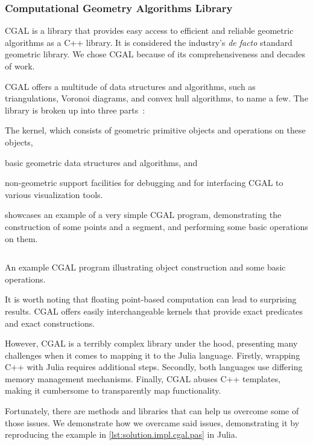 \subsubsection{Computational Geometry Algorithms Library}%
\label{sec:solution.impl.cgal}

\Ac{CGAL} is a library that provides easy access to efficient and reliable
geometric algorithms as a C++ library.  It is considered the industry's
\textit{de facto} standard geometric library.  We chose \ac{CGAL} because of its
comprehensiveness and decades of work.

\ac{CGAL} offers a multitude of data structures and algorithms, such as
triangulations, Voronoi diagrams, and convex hull algorithms, to name a few.
The library is broken up into three parts~\cite{CGAL:5.3:23LGK}:
\begin{enumerate*}
  \item The kernel, which consists of geometric primitive objects and operations
  on these objects,
  \item basic geometric data structures and algorithms, and
  \item non-geometric support facilities for debugging and for interfacing
  \ac{CGAL} to various visualization tools.
\end{enumerate*}

 showcases an example of a very simple
\ac{CGAL} program, demonstrating the construction of some points and a segment,
and performing some basic operations on them.

\begin{listing}[htbp]
  \inputminted{cpp}{cpp/points_and_segments.cpp}
  \caption[CGAL: Three points and one segment]{
    An example CGAL program illustrating object construction and some
    basic operations.}\label{lst:solution.impl.cgal.pas}
\end{listing}

It is worth noting that floating point-based computation can lead to surprising
results.  \Ac{CGAL} offers easily interchangeable kernels that provide exact
predicates and exact constructions.

However, \ac{CGAL} is a terribly complex library under the hood, presenting many
challenges when it comes to mapping it to the Julia language.  Firstly, wrapping
C++ with Julia requires additional steps.  Secondly, both languages use differing
memory management mechanisms.  Finally, \ac{CGAL} abuses C++ templates, making
it cumbersome to transparently map functionality.

Fortunately, there are methods and libraries that can help us overcome some of
those issues.  We demonstrate how we overcame said issues, demonstrating it by
reproducing the example in \cref{lst:solution.impl.cgal.pas} in Julia.
